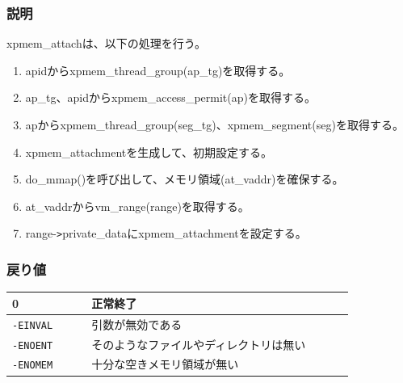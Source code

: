 \documentclass[twoside,11pt,fleqn]{book}
\begin{document}
\subsubsection*{説明}{\quad}
xpmem\_attachは、以下の処理を行う。
\begin{enumerate}
  \item apidからxpmem\_thread\_group(ap\_tg)を取得する。
  \item ap\_tg、apidからxpmem\_access\_permit(ap)を取得する。
  \item apからxpmem\_thread\_group(seg\_tg)、xpmem\_segment(seg)を取得する。
  \item xpmem\_attachmentを生成して、初期設定する。
  \item do\_mmap()を呼び出して、メモリ領域(at\_vaddr)を確保する。
  \item at\_vaddrからvm\_range(range)を取得する。
  \item range-\verb|>|private\_dataにxpmem\_attachmentを設定する。
\end{enumerate}


\subsubsection*{戻り値}{\quad}
\begin{table}[!h]
\footnotesize
\begin{tabular}{|p{0.20\linewidth}|p{0.66\linewidth}|} \hline
0&正常終了\\ \hline
\texttt{-EINVAL}&引数が無効である\\ \hline
\texttt{-ENOENT}&そのようなファイルやディレクトリは無い\\ \hline
\texttt{-ENOMEM}&十分な空きメモリ領域が無い\\ \hline
\end{tabular}
\vspace{-0em}
\end{table}
\FloatBarrier
\end{document}
